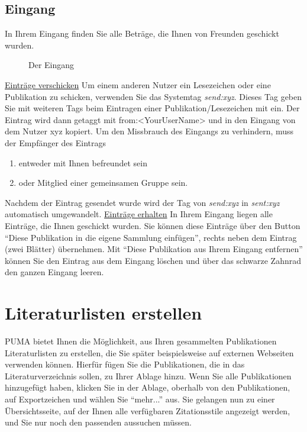 \subsection{Eingang}
In Ihrem Eingang finden Sie alle Beträge, die Ihnen von Freunden geschickt wurden.
\begin{figure}[h!]
 \centering
 \caption{Der Eingang}
 \label{figure034}
\end{figure}
\underline{Einträge verschicken}
\newline
Um einem anderen Nutzer ein Lesezeichen oder eine Publikation zu schicken, verwenden Sie das Systemtag \textit{send:xyz}. Dieses Tag geben Sie mit weiteren Tags beim Eintragen einer Publikation/Lesezeichen mit ein. Der Eintrag wird dann getaggt mit from:<YourUserName> und in den Eingang von dem Nutzer xyz kopiert. Um den Missbrauch des Eingangs zu verhindern, muss der Empfänger des Eintrags
\begin{enumerate}
    \item entweder mit Ihnen befreundet sein
    \item oder Mitglied einer gemeinsamen Gruppe sein.
\end{enumerate}
Nachdem der Eintrag gesendet wurde wird der Tag von \textit{send:xyz} in \textit{sent:xyz} automatisch umgewandelt.
\newline
\newline
\underline{Einträge erhalten}
\newline
In Ihrem Eingang liegen alle Einträge, die Ihnen geschickt wurden. Sie können diese Einträge über den Button \enquote{Diese Publikation in die eigene Sammlung einfügen}, rechts neben dem Eintrag (zwei Blätter) übernehmen. Mit \enquote{Diese Publikation aus Ihrem Eingang entfernen} können Sie den Eintrag aus dem Eingang löschen und über das schwarze Zahnrad den ganzen Eingang leeren.
\section{Literaturlisten erstellen}
PUMA bietet Ihnen die Möglichkeit, aus Ihren gesammelten Publikationen Literaturlisten zu erstellen, die Sie später beispielsweise auf externen Webseiten verwenden können. \newline
Hierfür fügen Sie die Publikationen, die in das Literaturverzeichnis sollen, zu Ihrer Ablage hinzu. Wenn Sie alle Publikationen hinzugefügt haben, klicken Sie in der Ablage, oberhalb von den Publikationen, auf Exportzeichen und wählen Sie \enquote{mehr...} aus. Sie gelangen nun zu einer Übersichtsseite, auf der Ihnen alle verfügbaren Zitationsstile angezeigt werden, und Sie nur noch den passenden aussuchen müssen. 
